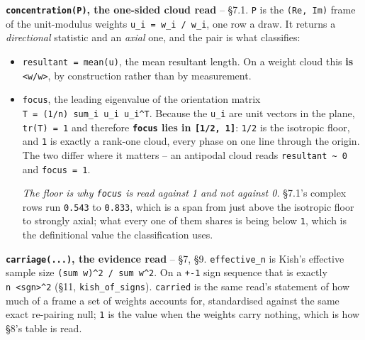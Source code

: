 \documentclass[10pt,letterpaper,twocolumn]{article}
\begin{document}
\textbf{\texttt{concentration(\allowbreak{}P)\allowbreak{}}, the one-sided cloud read} -- §7.1. \texttt{P} is the \texttt{(\allowbreak{}Re,\allowbreak{}\ Im)\allowbreak{}} frame of the
unit-modulus weights \texttt{u\_\allowbreak{}i\ =\allowbreak{}\ w\_\allowbreak{}i\ /\allowbreak{}\ \textbar{}\allowbreak{}w\_\allowbreak{}i\textbar{}\allowbreak{}}, one row a draw. It returns a \emph{directional} statistic and
an \emph{axial} one, and the pair is what classifies:

\begin{itemize}
\item
  \texttt{resultant\ =\allowbreak{}\ \textbar{}\allowbreak{}mean(\allowbreak{}u)\allowbreak{}\textbar{}\allowbreak{}}, the mean resultant length. On a weight cloud this \textbf{is} \texttt{\textbar{}\allowbreak{}\textless{}\allowbreak{}w/\allowbreak{}\textbar{}\allowbreak{}w\textbar{}\allowbreak{}\textgreater{}\allowbreak{}\textbar{}\allowbreak{}},
  by construction rather than by measurement.
\item
  \texttt{focus}, the leading eigenvalue of the orientation matrix \texttt{T\ =\allowbreak{}\ (\allowbreak{}1/\allowbreak{}n)\allowbreak{}\ sum\_\allowbreak{}i\ u\_\allowbreak{}i\ u\_\allowbreak{}i\^{}T}. Because
  the \texttt{u\_\allowbreak{}i} are unit vectors in the plane, \texttt{tr(\allowbreak{}T)\allowbreak{}\ =\allowbreak{}\ 1} and therefore \textbf{\texttt{focus} lies in
  \texttt{[\allowbreak{}1/\allowbreak{}2,\allowbreak{}\ 1]\allowbreak{}}}: \texttt{1/\allowbreak{}2} is the isotropic floor, and \texttt{1} is exactly a rank-one cloud, every phase on
  one line through the origin. The two differ where it matters -- an antipodal cloud reads
  \texttt{resultant\ \textasciitilde{}\ 0} and \texttt{focus\ =\allowbreak{}\ 1}.

  \emph{The floor is why \texttt{focus} is read against 1 and not against 0.} §7.1's complex rows run \texttt{0.\allowbreak{}543}
  to \texttt{0.\allowbreak{}833}, which is a span from just above the isotropic floor to strongly axial; what every
  one of them shares is being below \texttt{1}, which is the definitional value the classification uses.
\end{itemize}

\textbf{\texttt{carriage(\allowbreak{}.\allowbreak{}.\allowbreak{}.\allowbreak{})\allowbreak{}}, the evidence read} -- §7, §9. \texttt{effective\_\allowbreak{}n} is Kish's effective sample size
\texttt{(\allowbreak{}sum\ w)\allowbreak{}\^{}2\ /\allowbreak{}\ sum\ w\^{}2}. On a \texttt{+\allowbreak{}-{}\allowbreak{}1} sign sequence that is exactly \texttt{n\ \textless{}\allowbreak{}sgn\textgreater{}\allowbreak{}\^{}2} (§11,
\texttt{kish\_\allowbreak{}of\_\allowbreak{}signs}). \texttt{carried} is the same read's statement of how much of a frame a set of weights
accounts for, standardised against the same exact re-pairing null; \texttt{1} is the value when the
weights carry nothing, which is how §8's table is read.
\end{document}
